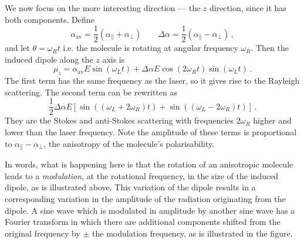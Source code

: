 \documentclass{article}
\theoremstyle{plain}\theoremheaderfont{\normalfont\itshape}\theorembodyfont{\rmfamily}\theoremseparator{.}\newtheorem*{rem}{Remark}\newtheorem*{ex}{Example}\newtheorem*{proof}{Proof}\newtheorem*{altp}{Alternative proof}
\theoremstyle{plain}\theoremheaderfont{\normalfont\bfseries}\theorembodyfont{\rmfamily}\theoremseparator{.}\newtheorem{thm}{Theorem}[section]\newtheorem{lem}[thm]{Lemma}\newtheorem{prop}[thm]{Proposition}\newtheorem*{cor}{Corollary}\newtheorem{defn}[thm]{Definition}\newtheorem{clm}[thm]{Claim}\newtheorem{clminproof}{Claim}\newtheorem{pos}{Postulate}[section]
\theoremstyle{break}\theoremheaderfont{\normalfont\itshape}\theorembodyfont{\rmfamily}\theoremseparator{.\medskip}\newtheorem*{proofskip}{Proof}\newtheorem*{exs}{Examples}\newtheorem*{rems}{Remarks}
\theoremstyle{break}\theoremheaderfont{\normalfont\bfseries}\theorembodyfont{\rmfamily}\theoremseparator{.\medskip}\newtheorem{lemskip}[thm]{Lemma}\newtheorem{defnskip}[thm]{Definition}\newtheorem{propskip}[thm]{Proposition}\newtheorem{thmskip}[thm]{Theorem}
\numberwithin{equation}{section}
\begin{document}
    We now focus on the more interesting direction --- the \(z\) direction, since it has both components. Define
    \begin{equation}
        \alpha_{\text{av}}=\frac{1}{2}(\alpha_\parallel+\alpha_\perp)\qquad\Delta\alpha=\frac{1}{2}(\alpha_\parallel-\alpha_\perp)\,,
    \end{equation}
    and let \(\theta=\omega_R t\) i.e. the molecule is rotating at angular frequency \(\omega_R\). Then the induced dipole along the \(z\) axis is
    \begin{equation}
        \mu_z=\alpha_{\text{av}}E\sin(\omega_L t)+\Delta\alpha E\cos(2\omega_R t)\sin(\omega_L t)\,.
    \end{equation}
    The first term has the same frequency as the laser, so it gives rise to the Rayleigh scattering. The second term can be rewritten as
    \begin{equation}
        \frac{1}{2}\Delta\alpha E\left[\sin((\omega_L+2\omega_R)t)+\sin((\omega_L-2\omega_R)t)\right]\,.
    \end{equation}
    They are the Stokes and anti-Stokes scattering with frequencies \(2\omega_R\) higher and lower than the laser frequency. Note the amplitude of these terms is proportional to \(\alpha_\parallel-\alpha_\perp\), the anisotropy of the molecule's polarisability.

    In words, what is happening here is that the rotation of an anisotropic molecule leads to a \textit{modulation}, at the rotational frequency, in the size of the induced dipole, as is illustrated above. This variation of the dipole results in a corresponding variation in the amplitude of the radiation originating from the dipole. A sine wave which is modulated in amplitude by another sine wave has a Fourier transform in which there are additional components shifted from the original frequency by \(\pm\) the modulation frequency, as is illustrated in the figure.
\end{document}
